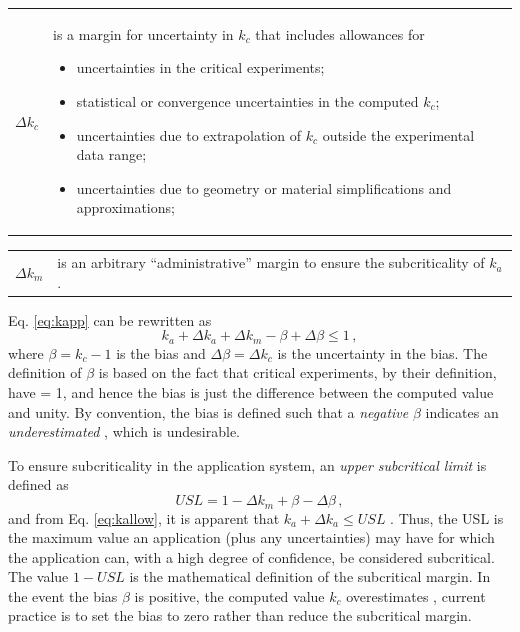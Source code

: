 \begin{tabular}{rp{10cm}}
 $\Delta k_c$    & is a margin for uncertainty in $k_c$ that includes 
                   allowances for
                 \begin{itemize}
                   \item uncertainties in the critical experiments;
                   \item statistical or convergence uncertainties
                         in the computed $k_c$;
                   \item uncertainties due to extrapolation of $k_c$ 
                         outside the experimental data range;
                   \item uncertainties due to geometry or material
                         simplifications and approximations;
                 \end{itemize}
\end{tabular}

\begin{tabular}{rp{12cm}}
 $\Delta k_m$    & is an arbitrary ``administrative'' 
                   margin to ensure the subcriticality 
                   of $k_a$. \\
\end{tabular}

Eq. \ref{eq:kapp} can be rewritten as
\begin{equation}
 k_a + \Delta k_a + \Delta k_m - \beta + \Delta \beta \leq 1 \, ,
\label{eq:kallow}
\end{equation}
where $\beta = k_c - 1$ is the bias and $\Delta \beta = \Delta k_c$ is the 
uncertainty in the bias.  The definition of $\beta$ is based on the fact 
that critical experiments, by their definition, have \keff = 1, and hence 
the bias is just the difference between the computed value and unity.  By 
convention, the bias is defined such that a \textit{ negative} $\beta$ 
indicates an \textit{ underestimated} \keff\!, which is undesirable.

To ensure subcriticality in the application system, an \textit{ upper 
subcritical limit} is defined as
\begin{equation}
 USL = 1 - \Delta k_m + \beta - \Delta \beta \, ,
\label{eq:usl}
\end{equation}
and from Eq. \ref{eq:kallow}, it is apparent that $k_a + \Delta k_a \leq USL$ 
\cite{lichtenwalter1997cbg}.   Thus, the USL is the maximum value an 
application \keff (plus any uncertainties) may have for which the 
application can, with a high degree of confidence, be considered 
subcritical.  The value $1 - USL$  is the mathematical definition of the 
subcritical margin.  In the event the bias $\beta$ is positive, \ie the 
computed value $k_c$ overestimates \keff\!, current practice is to set 
the bias to zero rather than reduce the subcritical margin.

